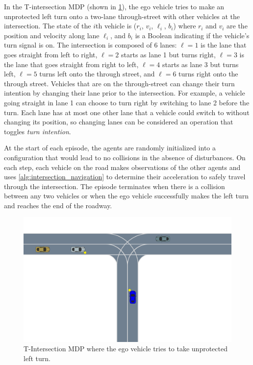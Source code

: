 In the T-intersection MDP (shown in \cref{fig:t_intersection}), the ego vehicle tries to make an unprotected left turn onto a two-lane through-street with other vehicles at the intersection. The state of the $i$th vehicle is ($r_i$, $v_i$, $\ell_i$, $b_i$) where $r_i$ and $v_i$ are the position and velocity along lane $\ell_i$, and $b_i$ is a Boolean indicating if the vehicle's turn signal is on. The intersection is composed of \num{6} lanes: $\ell = 1$ is the lane that goes straight from left to right, $\ell = 2$ starts as lane \num{1} but turns right, $\ell = 3$ is the lane that goes straight from right to left, $\ell = 4$ starts as lane \num{3} but turns left, $\ell = 5$ turns left onto the through street, and $\ell = 6$ turns right onto the through street. Vehicles that are on the through-street can change their turn intention by changing their lane prior to the intersection. For example, a vehicle going straight in lane \num{1} can choose to turn right by switching to lane \num{2} before the turn. Each lane has at most one other lane that a vehicle could switch to without changing its position, so changing lanes can be considered an operation that toggles \emph{turn intention}.

At the start of each episode, the agents are randomly initialized into a configuration that would lead to no collisions in the absence of disturbances. On each step, each vehicle on the road makes observations of the other agents and uses \cref{alg:intersection_navigation} to determine their acceleration to safely travel through the intersection. The episode terminates when there is a collision between any two vehicles or when the ego vehicle successfully makes the left turn and reaches the end of the roadway. 

\begin{figure}
    \centering
    \includegraphics[trim={0 5cm 0 0},clip, width=\textwidth]{figures/sample_systems/T_intersection.pdf}
    \caption{T-Intersection MDP where the ego vehicle tries to take unprotected left turn. }
    \label{fig:t_intersection}
\end{figure}

